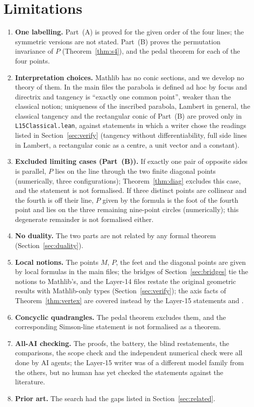 \documentclass[11pt]{article}
\theoremstyle{definition}
\theoremstyle{remark}
\newcommand{\lean}[1]{\texttt{#1}}
\begin{document}
\section{Limitations}\label{sec:limits}
\begin{enumerate}
\item \textbf{One labelling.} Part~(A) is proved for the given order of the four lines; the symmetric
versions are not stated. Part~(B) proves the permutation invariance of $P$ (Theorem~\ref{thm:s4}), and
the pedal theorem for each of the four points.
\item \textbf{Interpretation choices.} Mathlib has no conic sections, and we develop no theory of
them. In the main files the parabola is defined ad hoc by focus and directrix and tangency is ``exactly
one common point'', weaker than the classical notion; uniqueness of the inscribed parabola, Lambert
in general, the classical tangency and the rectangular conic of Part~(B) are proved only in
\lean{L15Classical.lean}, against statements in which a writer chose the readings listed in
Section~\ref{sec:verify} (tangency without differentiability, full side lines in Lambert, a rectangular
conic as a centre, a unit vector and a constant).
\item \textbf{Excluded limiting cases (Part~(B)).} If exactly one pair of opposite sides is parallel,
$P$ lies on the line through the two finite diagonal points (numerically, three configurations); Theorem~\ref{thm:diag} excludes this
case, and the statement is not formalised. If three distinct points are collinear and the fourth is off their line,
$P$ given by the formula is the foot of the fourth point and lies on the three remaining nine-point circles (numerically); this
degenerate remainder is not formalised either.
\item \textbf{No duality.} The two parts are not related by any formal theorem
(Section~\ref{sec:duality}).
\item \textbf{Local notions.} The points $M$, $P$, the feet and the diagonal points are given by local
formulas in the main files; the bridges of Section~\ref{sec:bridges} tie the notions to Mathlib's,
and the Layer-14 files restate the original geometric results with Mathlib-only types
(Section~\ref{sec:verify}); the axis facts of Theorem~\ref{thm:vertex} are covered instead by the
Layer-15 statements  and
.
\item \textbf{Concyclic quadrangles.} The pedal theorem excludes them, and the corresponding Simson-line
statement is not formalised as a theorem.
\item \textbf{All-AI checking.} The proofs, the battery, the blind restatements, the comparisons, the
scope check and the independent numerical check were all done by AI agents; the Layer-15 writer was
of a different model family from the others, but no human has yet checked the statements against the
literature.
\item \textbf{Prior art.} The search had the gaps listed in Section~\ref{sec:related}.
\end{enumerate}
\end{document}
